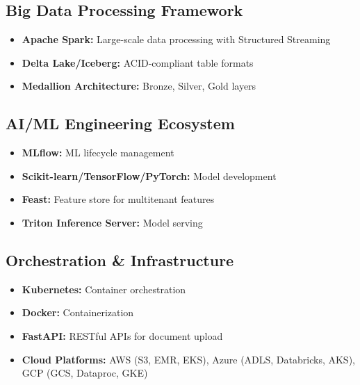 \documentclass[11pt]{article}
\begin{document}
\subsection{Big Data Processing Framework}
\begin{itemize}
    \item \textbf{Apache Spark:} Large-scale data processing with Structured Streaming
    \item \textbf{Delta Lake/Iceberg:} ACID-compliant table formats
    \item \textbf{Medallion Architecture:} Bronze, Silver, Gold layers
\end{itemize}

\subsection{AI/ML Engineering Ecosystem}
\begin{itemize}
    \item \textbf{MLflow:} ML lifecycle management
    \item \textbf{Scikit-learn/TensorFlow/PyTorch:} Model development
    \item \textbf{Feast:} Feature store for multitenant features
    \item \textbf{Triton Inference Server:} Model serving
\end{itemize}

\subsection{Orchestration \& Infrastructure}
\begin{itemize}
    \item \textbf{Kubernetes:} Container orchestration
    \item \textbf{Docker:} Containerization
    \item \textbf{FastAPI:} RESTful APIs for document upload
    \item \textbf{Cloud Platforms:} AWS (S3, EMR, EKS), Azure (ADLS, Databricks, AKS), GCP (GCS, Dataproc, GKE)
\end{itemize}

\end{document}
